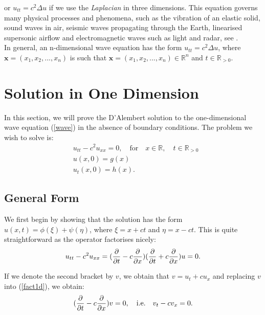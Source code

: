 \documentclass[a4paper, 12pt]{article}
\numberwithin{equation}{section}
\begin{document}
or $u_{tt}=c^2 \Delta u$ if we use the \emph{Laplacian} in three dimensions.
This equation governs many physical processes and phenomena, such as the
vibration of an elastic solid, sound waves in air, seismic waves propagating
through the Earth, linearised supersonic airflow and electromagnetic waves such
as light and radar, see \cite[Ch. 1, Ex. 3]{Str}. \\

In general, an n-dimensional wave equation has the form $u_{tt}=c^2 \Delta u$,
where $\boldsymbol{x}=(x_1, x_2, ..., x_n)$ is such that $\boldsymbol{x}=(x_1,
x_2, ..., x_n) \in \mathbb{R}^n$ and $t \in \mathbb{R}_{>0}$.

\section{Solution in One Dimension}
In this section, we will prove the D'Alembert solution to the one-dimensional
wave equation (\ref{wave}) in the absence of boundary conditions. The problem we
wish to solve is:
\begin{equation} \label{ivp1d}
    \begin{aligned}
    &u_{tt}-c^2u_{xx}=0, \quad \textrm{for} \quad x\in \mathbb{R},\quad t\in \mathbb{R}_{>0}\\
    &u(x,0)=g(x)\\
    &u_t(x,0)=h(x).
    \end{aligned}
\end{equation}

\subsection{General Form}

We first begin by showing that the solution has the form $u(x,
t)=\phi(\xi)+\psi(\eta)$, where $\xi=x+ct$ and $\eta=x-ct$. This is quite
straightforward as the operator factorises nicely:
\begin{equation} \label{fact1d}
    u_{tt}-c^2u_{xx}=(\diffp[1]{}{t} - c \diffp[1]{}{x})(\diffp[1]{}{t} + c \diffp[1]{}{x})u=0.
\end{equation}

If we denote the second bracket by $v$, we obtain that $v=u_t+cu_x$ and replacing
$v$ into (\ref{fact1d}), we obtain:
\begin{equation*} 
    (\diffp[1]{}{t} -c \diffp[1]{}{x})v=0, \quad \textrm{i.e.} \quad v_t-cv_x=0.
\end{equation*}
\end{document}
